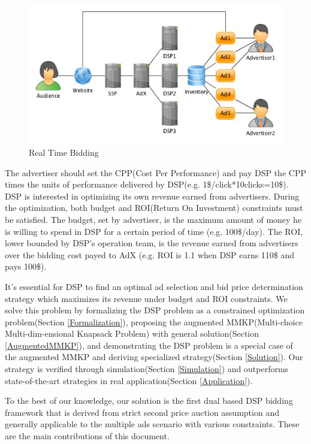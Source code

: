 \documentclass{article}
\begin{document}
\begin{figure}[!h]
\centering
\includegraphics[width=1.0\linewidth]{./DSP.jpg}
\caption{Real Time Bidding}
\end{figure}

The advertiser should set the CPP(Cost Per Performance) and
    pay DSP the CPP times the units of performance delivered by DSP(e.g. 1\$/click*10clicks=10\$).
DSP is interested in optimizing its own revenue earned from advertisers.
During the optimization, both budget and ROI(Return On Investment) constraints must be satisfied.
The budget, set by advertiser, is the maximum amount of money he is willing to spend in DSP for a certain period of time (e.g. 100\$/day).
The ROI, lower bounded by DSP's operation team, is the revenue earned from advertisers over the bidding cost payed to AdX
    (e.g. ROI is 1.1 when DSP earns 110\$ and pays 100\$).

It's essential for DSP to find an optimal ad selection and bid price determination strategy
    which maximizes its revenue under budget and ROI constraints.
We solve this problem by
    formalizing the DSP problem as a constrained optimization problem(Section \ref{Formalization}),
    proposing the augmented MMKP(Multi-choice Multi-dim-ensional Knapsack Problem) with general solution(Section \ref{AugmentedMMKP}),
    and demonstrating the DSP problem is a special case of the augmented MMKP and deriving specialized strategy(Section \ref{Solution}).
Our strategy is verified through simulation(Section \ref{Simulation}) and
    outperforms state-of-the-art strategies in real application(Section \ref{Application}).

To the best of our knowledge, our solution is the first dual based DSP bidding framework
    that is derived from strict second price auction assumption and
    generally applicable to the multiple ads scenario with various constraints.
These are the main contributions of this document.
\end{document}
